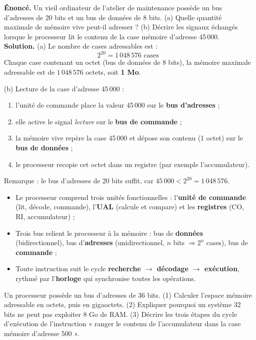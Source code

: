 \documentclass[11pt]{article}
\begin{document}
\begin{exoresolu}
\textbf{Énoncé.} Un vieil ordinateur de l'atelier de maintenance possède un bus d'adresses de 20 bits et un bus de données de 8 bits. (a) Quelle quantité maximale de mémoire vive peut-il adresser ? (b) Décrire les signaux échangés lorsque le processeur lit le contenu de la case mémoire d'adresse 45\,000.
\tcblower
\textbf{Solution.} (a) Le nombre de cases adressables est :
\[ 2^{20} = 1\,048\,576 \text{ cases} \]
Chaque case contenant un octet (bus de données de 8 bits), la mémoire maximale adressable est de $1\,048\,576$ octets, soit \textbf{1 Mo}.

(b) Lecture de la case d'adresse 45\,000 :
\begin{enumerate}
  \item l'unité de commande place la valeur 45\,000 sur le \textbf{bus d'adresses} ;
  \item elle active le signal \emph{lecture} sur le \textbf{bus de commande} ;
  \item la mémoire vive repère la case 45\,000 et dépose son contenu (1 octet) sur le \textbf{bus de données} ;
  \item le processeur recopie cet octet dans un registre (par exemple l'accumulateur).
\end{enumerate}
Remarque : le bus d'adresses de 20 bits suffit, car $45\,000 < 2^{20} = 1\,048\,576$.
\end{exoresolu}

\begin{aretenir}
\begin{itemize}
  \item Le processeur comprend trois unités fonctionnelles : l'\textbf{unité de commande} (lit, décode, commande), l'\textbf{UAL} (calcule et compare) et les \textbf{registres} (CO, RI, accumulateur) ;
  \item Trois bus relient le processeur à la mémoire : bus de \textbf{données} (bidirectionnel), bus d'\textbf{adresses} (unidirectionnel, $n$ bits $\Rightarrow 2^n$ cases), bus de \textbf{commande} ;
  \item Toute instruction suit le cycle \textbf{recherche $\rightarrow$ décodage $\rightarrow$ exécution}, rythmé par l'\textbf{horloge} qui synchronise toutes les opérations.
\end{itemize}
\end{aretenir}

\begin{exercice}
Un processeur possède un bus d'adresses de 36 bits. (1) Calculer l'espace mémoire adressable en octets, puis en gigaoctets. (2) Expliquer pourquoi un système 32 bits ne peut pas exploiter 8 Go de RAM. (3) Décrire les trois étapes du cycle d'exécution de l'instruction « ranger le contenu de l'accumulateur dans la case mémoire d'adresse 500 ».
\end{exercice}
\end{document}
